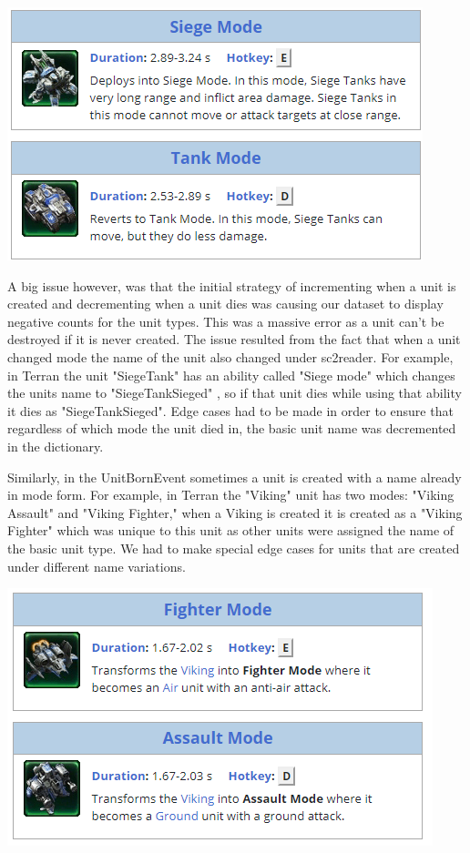 \documentclass[a4paper,12pt]{report}
\begin{document}
\begin{enumerate}
\begin{center}
    \captionsetup{type=figure}
    \includegraphics[width=.9\linewidth]{media/SiegeTank.png}
\end{center}

A big issue however, was that the initial strategy of incrementing when a unit is created and decrementing when a unit dies was causing our dataset to display negative counts for the unit types. This was a massive error as a unit can’t be destroyed if it is never created. The issue resulted from the fact that when a unit changed mode the name of the unit also changed under sc2reader. For example, in Terran the unit "SiegeTank" has an ability called "Siege mode" which changes the units name to "SiegeTankSieged" , so if that unit dies while using that ability it dies as "SiegeTankSieged". Edge cases had to be made in order to ensure that regardless of which mode the unit died in, the basic unit name was decremented in the dictionary.

Similarly, in the UnitBornEvent sometimes a unit is created with a name already in mode form. For example, in Terran the "Viking" unit has two modes: "Viking Assault" and "Viking Fighter," when a Viking is created it is created as a "Viking Fighter" which was unique to this unit as other units were assigned the name of the basic unit type. We had to make special edge cases for units that are created under different name variations. 

\begin{center}
    \captionsetup{type=figure}
    \includegraphics[width=.9\linewidth]{media/Viking.png}
\end{center}


\end{enumerate}
\end{document}
